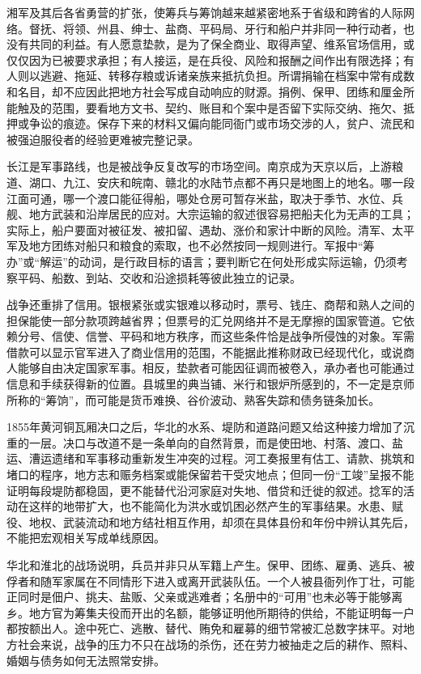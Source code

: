 湘军及其后各省勇营的扩张，使筹兵与筹饷越来越紧密地系于省级和跨省的人际网络。督抚、将领、州县、绅士、盐商、平码局、牙行和船户并非同一种行动者，也没有共同的利益。有人愿意垫款，是为了保全商业、取得声望、维系官场信用，或仅仅因为已被要求承担；有人接运，是在兵役、风险和报酬之间作出有限选择；有人则以逃避、拖延、转移存粮或诉诸亲族来抵抗负担。所谓捐输在档案中常有成数和名目，却不应因此把地方社会写成自动响应的财源。捐例、保甲、团练和厘金所能触及的范围，要看地方文书、契约、账目和个案中是否留下实际交纳、拖欠、抵押或争讼的痕迹。保存下来的材料又偏向能同衙门或市场交涉的人，贫户、流民和被强迫服役者的经验更难被完整记录。

长江是军事路线，也是被战争反复改写的市场空间。南京成为天京以后，上游粮道、湖口、九江、安庆和皖南、赣北的水陆节点都不再只是地图上的地名。哪一段江面可通，哪一个渡口能征得船，哪处仓房可暂存米盐，取决于季节、水位、兵舰、地方武装和沿岸居民的应对。大宗运输的叙述很容易把船夫化为无声的工具；实际上，船户要面对被征发、被扣留、遇劫、涨价和家计中断的风险。清军、太平军及地方团练对船只和粮食的索取，也不必然按同一规则进行。军报中“筹办”或“解运”的动词，是行政目标的语言；要判断它在何处形成实际运输，仍须考察平码、船数、到站、交收和沿途损耗等彼此独立的记录。

战争还重排了信用。银根紧张或实银难以移动时，票号、钱庄、商帮和熟人之间的担保能使一部分款项跨越省界；但票号的汇兑网络并不是无摩擦的国家管道。它依赖分号、信使、信誉、平码和地方秩序，而这些条件恰是战争所侵蚀的对象。军需借款可以显示官军进入了商业信用的范围，不能据此推称财政已经现代化，或说商人能够自由决定国家军事。相反，垫款者可能因征调而被卷入，承办者也可能通过信息和手续获得新的位置。县城里的典当铺、米行和银炉所感到的，不一定是京师所称的“筹饷”，而可能是货币难换、谷价波动、熟客失踪和债务链条加长。

1855年黄河铜瓦厢决口之后，华北的水系、堤防和道路问题又给这种接力增加了沉重的一层。决口与改道不是一条单向的自然背景，而是使田地、村落、渡口、盐运、漕运遗绪和军事移动重新发生冲突的过程。河工奏报里有估工、请款、挑筑和堵口的程序，地方志和赈务档案或能保留若干受灾地点；但同一份“工竣”呈报不能证明每段堤防都稳固，更不能替代沿河家庭对失地、借贷和迁徙的叙述。捻军的活动在这样的地带扩大，也不能简化为洪水或饥困必然产生的军事结果。水患、赋役、地权、武装流动和地方结社相互作用，却须在具体县份和年份中辨认其先后，不能把宏观相关写成单线原因。

华北和淮北的战场说明，兵员并非只从军籍上产生。保甲、团练、雇勇、逃兵、被俘者和随军家属在不同情形下进入或离开武装队伍。一个人被县衙列作丁壮，可能正同时是佃户、挑夫、盐贩、父亲或逃难者；名册中的“可用”也未必等于能够离乡。地方官为筹集夫役而开出的名额，能够证明他所期待的供给，不能证明每一户都按额出人。途中死亡、逃散、替代、贿免和雇募的细节常被汇总数字抹平。对地方社会来说，战争的压力不只在战场的杀伤，还在劳力被抽走之后的耕作、照料、婚姻与债务如何无法照常安排。

